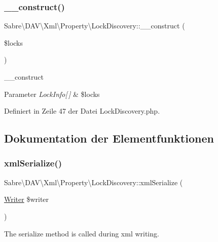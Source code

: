 \subsubsection{\texorpdfstring{\+\_\+\+\_\+construct()}{\_\_construct()}}
{\footnotesize\ttfamily Sabre\textbackslash{}\+D\+A\+V\textbackslash{}\+Xml\textbackslash{}\+Property\textbackslash{}\+Lock\+Discovery\+::\+\_\+\+\_\+construct (\begin{DoxyParamCaption}\item[{}]{\$locks }\end{DoxyParamCaption})}

\+\_\+\+\_\+construct


\begin{DoxyParams}{Parameter}
{\em Lock\+Info\mbox{[}$\,$\mbox{]}} & \$locks \\
\hline
\end{DoxyParams}


Definiert in Zeile 47 der Datei Lock\+Discovery.\+php.



\subsection{Dokumentation der Elementfunktionen}
\mbox{\label{class_sabre_1_1_d_a_v_1_1_xml_1_1_property_1_1_lock_discovery_a607122756acce92e3d2bc23ca99ef505}} 
\subsubsection{\texorpdfstring{xml\+Serialize()}{xmlSerialize()}}
{\footnotesize\ttfamily Sabre\textbackslash{}\+D\+A\+V\textbackslash{}\+Xml\textbackslash{}\+Property\textbackslash{}\+Lock\+Discovery\+::xml\+Serialize (\begin{DoxyParamCaption}\item[{\mbox{\hyperlink{class_sabre_1_1_xml_1_1_writer}{Writer}}}]{\$writer }\end{DoxyParamCaption})}

The serialize method is called during xml writing.

